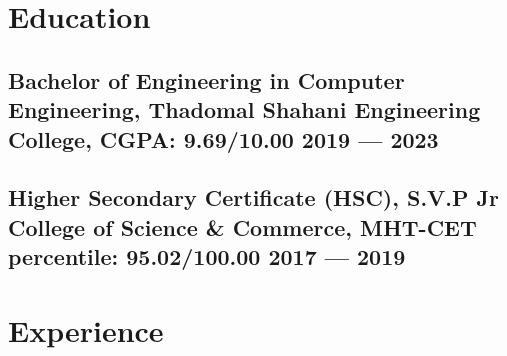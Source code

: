 \documentclass[a4,10pt]{article}
\newcommand{\subtext}[1]{
#1\par\vspace{-0.2cm}}
\newcommand{\hskills}[1]{
\textbf{\bfseries #1} }
\begin{document}


\section{Education }
\subsection*{Bachelor of Engineering in Computer Engineering, {\normalsize \normalfont Thadomal Shahani Engineering College, CGPA: \textbf{9.69}/10.00} \hfill 2019 --- 2023} 
\vspace{0.1cm}
\subsection*{Higher Secondary Certificate (HSC), {\normalsize \normalfont S.V.P Jr College of Science \& Commerce, MHT-CET percentile: 95.02/100.00} \hfill 2017 --- 2019} 
\vspace{0.2cm}


\section{Experience}

        
\end{document}
